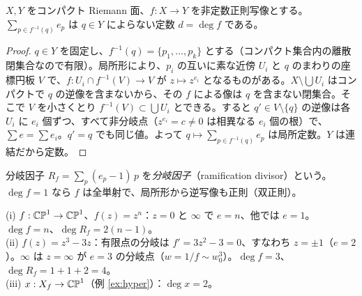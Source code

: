 \begin{thm}[写像の次数]\label{thm:degree}
$X,Y$ をコンパクト Riemann 面、$f:X\to Y$ を非定数正則写像とする。$\sum_{p\in f^{-1}(q)}e_p$ は $q\in Y$ によらない定数 $d=\deg f$ である。
\end{thm}
\begin{proof}
$q\in Y$ を固定し、$f^{-1}(q)=\{p_1,\dots,p_k\}$ とする（コンパクト集合内の離散閉集合なので有限）。局所形により、$p_i$ の互いに素な近傍 $U_i$ と $q$ のまわりの座標円板 $V$ で、$f:U_i\cap f^{-1}(V)\to V$ が $z\mapsto z^{e_i}$ となるものがある。$X\setminus\bigcup U_i$ はコンパクトで $q$ の逆像を含まないから、その $f$ による像は $q$ を含まない閉集合。そこで $V$ を小さくとり $f^{-1}(V)\subset\bigcup U_i$ とできる。すると $q'\in V\setminus\{q\}$ の逆像は各 $U_i$ に $e_i$ 個ずつ、すべて非分岐点（$z^{e_i}=c\ne0$ は相異なる $e_i$ 個の根）で、$\sum e=\sum e_i$。$q'=q$ でも同じ値。よって $q\mapsto\sum_{p\in f^{-1}(q)}e_p$ は局所定数。$Y$ は連結だから定数。 
\end{proof}
分岐因子 $R_f=\sum_p(e_p-1)\,p$ を\emph{分岐因子}（ramification divisor）という。$\deg f=1$ なら $f$ は全単射で、局所形から逆写像も正則（双正則）。

\begin{ex}\label{ex:degs}
(i) $f:\mathbb{CP}^1\to\mathbb{CP}^1$、$f(z)=z^n$：$z=0$ と $\infty$ で $e=n$、他では $e=1$。$\deg f=n$、$\deg R_f=2(n-1)$。\\
(ii) $f(z)=z^3-3z$：有限点の分岐は $f'=3z^2-3=0$、すなわち $z=\pm1$（$e=2$）。$\infty$ は $z=\infty$ が $e=3$ の分岐点（$w=1/f\sim w_0^3$）。$\deg f=3$、$\deg R_f=1+1+2=4$。\\
(iii) $x:X_f\to\mathbb{CP}^1$（例 \ref{ex:hyper}）：$\deg x=2$。
\end{ex}

